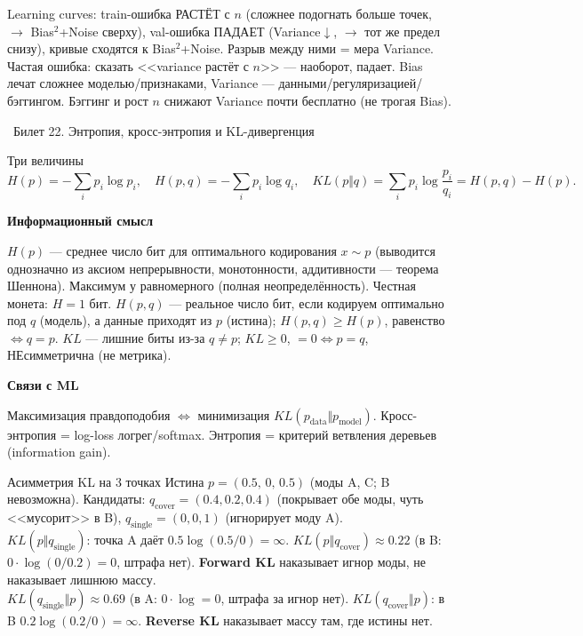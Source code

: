 \documentclass[12pt, a4paper]{article}
\newcommand{\bilet}[2]{%
  \vspace{10pt}%
  \noindent\colorbox{qcolor}{\parbox{\dimexpr\linewidth-2\fboxsep\relax}{%
    \color{white}\large\bfseries\strut\ Билет #1. #2%
  }}%
  \nopagebreak\vspace{5pt}\par\nopagebreak%
}
\newcommand{\qsub}[1]{%
  \vspace{5pt}%
  {\bfseries\color{defblue} #1}%
  \par\vspace{2pt}%
}
\begin{document}
\begin{fishkabox}
Learning curves: train-ошибка РАСТЁТ с $n$ (сложнее подогнать больше точек, $\to$ Bias$^2$+Noise сверху), val-ошибка ПАДАЕТ (Variance$\downarrow$, $\to$ тот же предел снизу), кривые сходятся к Bias$^2$+Noise. Разрыв между ними = мера Variance. Частая ошибка: сказать <<variance растёт с $n$>> --- наоборот, падает. Bias лечат сложнее моделью/признаками, Variance --- данными/регуляризацией/бэггингом. Бэггинг и рост $n$ снижают Variance почти бесплатно (не трогая Bias).
\end{fishkabox}

\bilet{22}{Энтропия, кросс-энтропия и KL-дивергенция}

\begin{defbox}{Три величины}
\[
  H(p) = -\sum_i p_i \log p_i, \quad H(p,q) = -\sum_i p_i \log q_i, \quad KL(p\Vert q) = \sum_i p_i\log\frac{p_i}{q_i} = H(p,q) - H(p).
\]
\end{defbox}

\qsub{Информационный смысл}
$H(p)$ --- среднее число бит для оптимального кодирования $x \sim p$ (выводится однозначно из аксиом непрерывности, монотонности, аддитивности --- теорема Шеннона). Максимум у равномерного (полная неопределённость). Честная монета: $H = 1$ бит. $H(p,q)$ --- реальное число бит, если кодируем оптимально под $q$ (модель), а данные приходят из $p$ (истина); $H(p,q) \ge H(p)$, равенство $\Leftrightarrow q = p$. $KL$ --- лишние биты из-за $q \ne p$; $KL \ge 0$, $= 0 \Leftrightarrow p = q$, НЕсимметрична (не метрика).

\qsub{Связи с ML}
Максимизация правдоподобия $\Leftrightarrow$ минимизация $KL(p_{\text{data}}\Vert p_{\text{model}})$. Кросс-энтропия = log-loss логрег/softmax. Энтропия = критерий ветвления деревьев (information gain).

\begin{exbox}{Асимметрия KL на 3 точках}
Истина $p = (0.5,\, 0,\, 0.5)$ (моды A, C; B невозможна). Кандидаты: $q_{\text{cover}} = (0.4, 0.2, 0.4)$ (покрывает обе моды, чуть <<мусорит>> в B), $q_{\text{single}} = (0, 0, 1)$ (игнорирует моду A).\\
$KL(p\Vert q_{\text{single}})$: точка A даёт $0.5\log(0.5/0) = \infty$. $KL(p\Vert q_{\text{cover}}) \approx 0.22$ (в B: $0\cdot\log(0/0.2) = 0$, штрафа нет). \textbf{Forward KL} наказывает игнор моды, не наказывает лишнюю массу.\\
$KL(q_{\text{single}}\Vert p) \approx 0.69$ (в A: $0\cdot\log = 0$, штрафа за игнор нет). $KL(q_{\text{cover}}\Vert p)$: в B $0.2\log(0.2/0) = \infty$. \textbf{Reverse KL} наказывает массу там, где истины нет.
\end{exbox}
\end{document}
